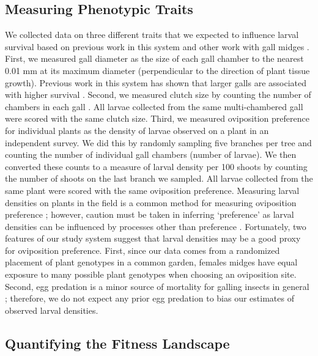 \documentclass[11pt,]{article}
\begin{document}
\subsection{Measuring Phenotypic
Traits}\label{measuring-phenotypic-traits}

We collected data on three different traits that we expected to
influence larval survival based on previous work in this system
\citep{Barbour2016} and other work with gall midges
\citep{Weis1983, Heath2018}. First, we measured gall diameter as the
size of each gall chamber to the nearest 0.01 mm at its maximum diameter
(perpendicular to the direction of plant tissue growth). Previous work
in this system has shown that larger galls are associated with higher
survival \citep{Barbour2016}. Second, we measured clutch size by
counting the number of chambers in each gall
\citep{Weis1983, Heath2018}. All larvae collected from the same
multi-chambered gall were scored with the same clutch size. Third, we
measured oviposition preference for individual plants as the density of
larvae observed on a plant in an independent survey. We did this by
randomly sampling five branches per tree and counting the number of
individual gall chambers (number of larvae). We then converted these
counts to a measure of larval density per 100 shoots by counting the
number of shoots on the last branch we sampled. All larvae collected
from the same plant were scored with the same oviposition preference.
Measuring larval densities on plants in the field is a common method for
measuring oviposition preference \citep{Gripenberg2010}; however,
caution must be taken in inferring `preference' as larval densities can
be influenced by processes other than preference \citep{Singer1986}.
Fortunately, two features of our study system suggest that larval
densities may be a good proxy for oviposition preference. First, since
our data comes from a randomized placement of plant genotypes in a
common garden, females midges have equal exposure to many possible plant
genotypes when choosing an oviposition site. Second, egg predation is a
minor source of mortality for galling insects in general
\citep{Hawkins1997}; therefore, we do not expect any prior egg predation
to bias our estimates of observed larval densities.

\subsection{Quantifying the Fitness
Landscape}\label{quantifying-the-fitness-landscape}
\end{document}
